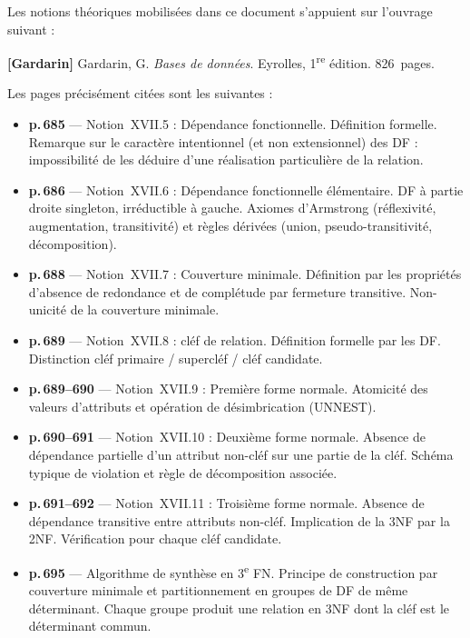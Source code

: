 \documentclass[12pt, a4paper]{article}
\begin{document}
    Les notions théoriques mobilisées dans ce document s'appuient sur l'ouvrage suivant :

    \bigskip
    \noindent\textbf{[Gardarin]} \quad Gardarin, G. \textit{Bases de données}. Eyrolles, 1\textsuperscript{re} édition. 826~pages.

    \bigskip
    \noindent Les pages précisément citées sont les suivantes :

    \begin{itemize}
        \item \textbf{p.\,685} --- Notion~XVII.5 : Dépendance fonctionnelle. Définition formelle.
        Remarque sur le caractère intentionnel (et non extensionnel) des DF : impossibilité de les
        déduire d'une réalisation particulière de la relation.

        \item \textbf{p.\,686} --- Notion~XVII.6 : Dépendance fonctionnelle élémentaire. DF à partie
        droite singleton, irréductible à gauche. Axiomes d'Armstrong (réflexivité, augmentation,
        transitivité) et règles dérivées (union, pseudo-transitivité, décomposition).

        \item \textbf{p.\,688} --- Notion~XVII.7 : Couverture minimale. Définition par les propriétés
        d'absence de redondance et de complétude par fermeture transitive. Non-unicité de la
        couverture minimale.

        \item \textbf{p.\,689} --- Notion~XVII.8 : cléf de relation. Définition formelle par les DF.
        Distinction cléf primaire / supercléf / cléf candidate.

        \item \textbf{p.\,689--690} --- Notion~XVII.9 : Première forme normale. Atomicité des valeurs
        d'attributs et opération de désimbrication (UNNEST).

        \item \textbf{p.\,690--691} --- Notion~XVII.10 : Deuxième forme normale. Absence de dépendance
        partielle d'un attribut non-cléf sur une partie de la cléf. Schéma typique de violation et
        règle de décomposition associée.

        \item \textbf{p.\,691--692} --- Notion~XVII.11 : Troisième forme normale. Absence de dépendance
        transitive entre attributs non-cléf. Implication de la 3NF par la 2NF. Vérification pour
        chaque cléf candidate.

        \item \textbf{p.\,695} --- Algorithme de synthèse en 3\textsuperscript{e} FN. Principe de
        construction par couverture minimale et partitionnement en groupes de DF de même déterminant.
        Chaque groupe produit une relation en 3NF dont la cléf est le déterminant commun.
    \end{itemize}
\end{document}
